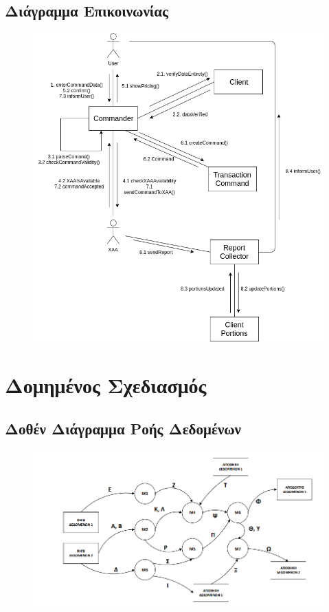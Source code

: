 \documentclass{article}
\begin{document}
\subsection{Διάγραμμα Επικοινωνίας}
\begin{figure}[!h]
	\includegraphics[width=\linewidth]{../UML/Communication_Diagram.png}
\end{figure}


\newpage
\section{Δομημένος Σχεδιασμός}
\subsection*{Δοθέν Διάγραμμα Ροής Δεδομένων}
\begin{figure}[!h]
	\includegraphics[width=\linewidth]{../Structured_Design/drd.png}
\end{figure}
\end{document}
